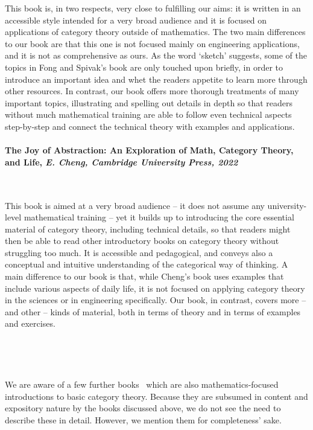 \documentclass[10pt, article, one side]{memoir}
\begin{document}
    This book is, in two respects, very close to fulfilling our aims: it is written in an accessible style intended for a very broad audience and it is focused on applications of category theory outside of mathematics.
    The two main differences to our book are that this one is not focused mainly on engineering applications, and it is not as comprehensive as ours.
    As the word `sketch' suggests, some of the topics in Fong and Spivak's book are only touched upon briefly, in order to introduce an important idea and whet the readers appetite to learn more through other resources.
    In contrast, our book offers more thorough treatments of many important topics, illustrating and spelling out details in depth so that readers without much mathematical training are able to follow even technical aspects step-by-step and connect the technical theory with examples and applications.

    \paragraph{The Joy of Abstraction: An Exploration of Math, Category Theory, and Life, \emph{E.
            Cheng, Cambridge University Press, 2022}~\cite{cheng2022joy}}
    \

    This book is aimed at a very broad audience -- it does not assume any university-level mathematical training -- yet it builds up to introducing the core essential material of category theory, including technical details, so that readers might then be able to read other introductory books on category theory without struggling too much.
    It is accessible and pedagogical, and conveys also a conceptual and intuitive understanding of the categorical way of thinking.
    A main difference to our book is that, while Cheng's book uses examples that include various aspects of daily life, it is not focused on applying category theory in the sciences or in engineering specifically.
    Our book, in contrast, covers more -- and other -- kinds of material, both in terms of theory and in terms of examples and exercises.

    \

    \

    We are aware of a few further books~\cite{Grandis,Roman,Simmons} which are also mathematics-focused introductions to basic category theory.
    Because they are subsumed in content and expository nature by the books discussed above, we do not see the need to describe these in detail.
    However, we mention them for completeness' sake.
\end{document}
